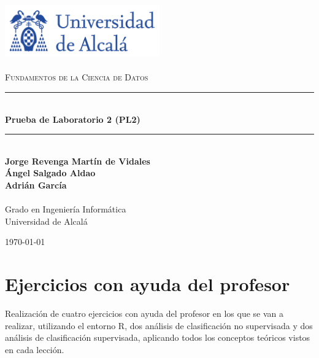 \documentclass[a4paper, 12pt]{article}
\newcommand{\HRule}{\rule{\linewidth}{0.5mm}}
\begin{document}

	\begin{titlepage}
		\begin{center}
			\includegraphics[width=0.5\textwidth]{logoUAH.png}~\\[2cm]
			
			\textsc{\Large \\Fundamentos de la Ciencia de Datos}\\[2cm]
			
			\HRule \\[0.4cm]
			{\LARGE \bfseries Prueba de Laboratorio 2 (PL2) \\[0.4cm]}
			\HRule \\[2cm]
			
			\large\textbf{Jorge Revenga Martín de Vidales}\\
			\large\textbf{Ángel Salgado Aldao}\\
			\large\textbf{Adrián García}\\
			\large\textbf{}\\ Grado en Ingeniería Informática \\ Universidad de Alcalá
			
			\vfill
			
			{\large \today}
		\end{center}
	\end{titlepage}
	\pagestyle{fancy}
	\fancyhf{} %
	\fancyfoot[RO,LE]{\thepage}  %
	\newpage
	
	\thispagestyle{plain}
	\tableofcontents
	
	
	\newpage
	
	\section{Ejercicios con ayuda del profesor}
	Realización de cuatro ejercicios con ayuda del profesor en los que se van a realizar, utilizando el entorno R, dos análisis de clasificación no supervisada y dos análisis de clasificación supervisada, aplicando todos los conceptos teóricos vistos en cada lección.
\end{document}
